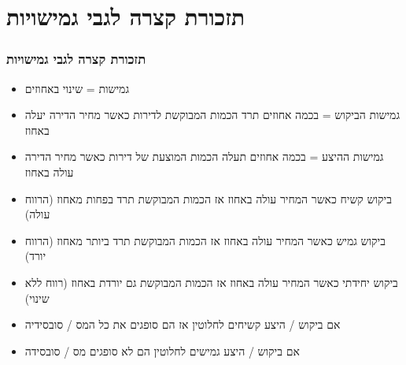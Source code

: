 \documentclass[usenames,dvipsnames]{beamer}
\begin{document}
\begin{RTL}
\begin{frame}
\end{frame}




\section{תזכורת קצרה לגבי גמישויות}
\begin{frame}[allowframebreaks]
    \frametitle{תזכורת קצרה לגבי גמישויות}
    \begin{itemize}
        \item גמישות = שינוי באחוזים
        \item גמישות הביקוש = בכמה אחוזים תרד הכמות המבוקשת לדירות כאשר מחיר הדירה יעלה באחוז
        \item גמישות ההיצע = בכמה אחוזים תעלה הכמות המוצעת של דירות כאשר מחיר הדירה עולה באחוז
        \item ביקוש קשיח כאשר המחיר עולה באחוז אז הכמות המבוקשת תרד בפחות מאחוז (הרווח עולה)
        \item ביקוש גמיש כאשר המחיר עולה באחוז אז הכמות המבוקשת תרד ביותר מאחוז (הרווח יורד)
        \item ביקוש יחידתי כאשר המחיר עולה באחוז אז הכמות המבוקשת גם יורדת באחוז (רווח ללא שינוי)
        \item אם ביקוש / היצע קשיחים לחלוטין אז הם סופגים את כל המס / סובסידיה
        \item אם ביקוש / היצע גמישים לחלוטין הם לא סופגים מס / סובסידה 


    \end{itemize}
    

\end{frame}
\end{RTL}
\end{document}
